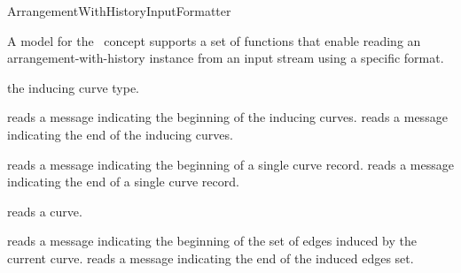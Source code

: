 
\ccRefPageBegin

\begin{ccRefConcept}{ArrangementWithHistoryInputFormatter}

A model for the \ccRefName\ concept supports a set of functions that enable
reading an arrangement-with-history instance from an input stream using a
specific format.

\ccRefines
{}

\ccTypes


    {the inducing curve type.}




    {reads a message indicating the beginning of the inducing curves.}
\ccGlue
{}
    {reads a message indicating the end of the inducing curves.}

    {reads a message indicating the beginning of a single curve record.}
\ccGlue
{}
    {reads a message indicating the end of a single curve record.}

    {reads a curve.}

    {reads a message indicating the beginning of the set of edges
     induced by the current curve.}
\ccGlue
{}
    {reads a message indicating the end of the induced edges set.}

\ccHasModels


\end{ccRefConcept}

\ccRefPageEnd

